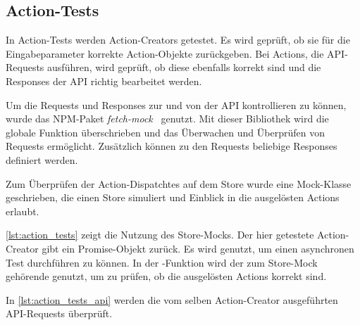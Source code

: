 \subsection{Action-Tests}
\label{sec:tf_action_tests}

In Action-Tests werden Action-Creators getestet.  Es wird geprüft, ob sie für
die Eingabeparameter korrekte Action-Objekte zurückgeben.  Bei Actions, die
API-Requests ausführen, wird geprüft, ob diese ebenfalls korrekt sind und die
Responses der API richtig bearbeitet werden.

Um die Requests und Responses zur und von der API kontrollieren zu können, wurde
das NPM-Paket \emph{fetch-mock}~\cite{fetch-mock} genutzt.  Mit dieser
Bibliothek wird die globale Funktion  überschrieben und das
Überwachen und Überprüfen von Requests ermöglicht.  Zusätzlich können zu den
Requests beliebige Responses definiert werden.

Zum Überprüfen der Action-Dispatchtes auf dem Store wurde eine Mock-Klasse
geschrieben, die einen Store simuliert und Einblick in die ausgelösten Actions
erlaubt.

\cref{lst:action_tests} zeigt die Nutzung des Store-Mocks.  Der hier getestete
Action-Creator  gibt ein Promise-Objekt zurück.  Es wird genutzt, um
einen asynchronen Test durchführen zu können.  In der -Funktion
wird der zum Store-Mock gehörende  genutzt, um zu prüfen,
ob die ausgelösten Actions korrekt sind.



In \cref{lst:action_tests_api} werden die vom selben Action-Creator ausgeführten
API-Requests überprüft.


